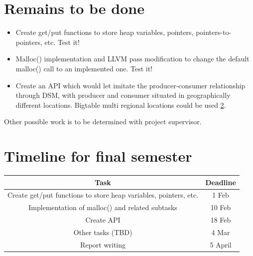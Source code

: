 \documentclass[bsc,frontabs,twoside,singlespacing,parskip,deptreport]{infthesis}     %
\begin{document}
\section{Remains to be done}

\begin{itemize}
\item
Create get/put functions to store heap variables, pointers, pointers-to-pointers, etc. Test it!
\item
Malloc() implementation and LLVM pass modification to change the default malloc() call to an implemented one. Test it!
\item
Create an API which would let imitate the producer-consumer relationship through DSM, with producer and consumer situated in geographically different locations. Bigtable multi regional locations could be used \ref{}.
\end{itemize}


Other possible work is to be determined with project supervisor.

\section{Timeline for final semester}

\begin{tabular} { | c | c | }
	\hline
 		Task & Deadline \\ [0.5ex] 
	\hline
	\hline
	Create get/put functions to store heap variables, pointers, etc. & 1 Feb \\
	\hline
	Implementation of malloc() and related subtasks & 10 Feb \\
	\hline
	Create API & 18 Feb \\
	\hline
	Other tasks (TBD) & 4 Mar \\
	\hline
	Report writing & 5 April \\
	\hline
\end{tabular}



\end{document}
